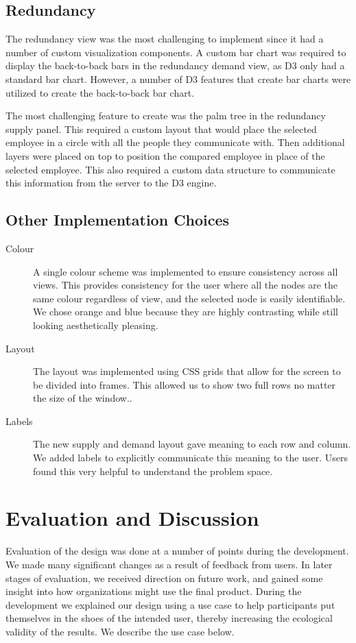 \documentclass[journal]{vgtc}                %
\begin{document}
\subsection{Redundancy}
The redundancy view was the most challenging to implement since it had a number of custom visualization components.  A custom bar chart was required to display the back-to-back bars in the redundancy demand view, as D3 only had a standard bar chart.  However, a number of D3 features that create bar charts were utilized to create the back-to-back bar chart.

The most challenging feature to create was the palm tree in the redundancy supply panel.  This required a custom layout that would place the selected employee in a circle with all the people they communicate with.  Then additional layers were placed on top to position the compared employee in place of the selected employee.  This also required a custom data structure to communicate this information from the server to the D3 engine.

\subsection{Other Implementation Choices}

\begin{description}
\item [Colour] A single colour scheme was implemented to ensure consistency across all views.  This provides consistency for the user where all the nodes are the same colour regardless of view, and the selected node is easily identifiable. We chose orange and blue because they are highly contrasting while still looking aesthetically pleasing.
\item[Layout] The layout was implemented using CSS grids that allow for the screen to be divided into frames.  This allowed us to show two full rows no matter the size of the window..
\item[Labels] The new supply and demand layout gave meaning to each row and column. We added labels to explicitly communicate this meaning to the user.  Users found this very helpful to understand the problem space.
\end{description}

\section{Evaluation and Discussion}
\label{sec:evaldiscuss}

Evaluation of the design was done at a number of points during the development. We made many significant changes as a result of feedback from users. In later stages of evaluation, we received direction on future work, and gained some insight into how organizations might use the final product.  During the development we explained our design using a use case to help participants put themselves in the shoes of the intended user, thereby increasing the ecological validity of the results. We describe the use case below. 
\end{document}
